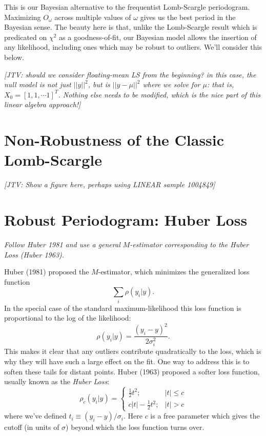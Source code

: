 \documentclass[12pt,pdftex]{article}
\newcommand{\jake}[1]{{\color{blue}\it[JTV: #1]}}
\begin{document}
This is our Bayesian alternative to the frequentist Lomb-Scargle periodogram.
Maximizing $O_\omega$ across multiple values of $\omega$ gives us the best period in the Bayesian sense.
The beauty here is that, unlike the Lomb-Scargle result which is predicated on $\chi^2$ as a goodness-of-fit, our Bayesian model allows the insertion of any likelihood, including ones which may be robust to outliers. We'll consider this below.

\jake{should we consider floating-mean LS from the beginning? in this case, the null model is not just $||y||^2$, but is $||y - \mu||^2$ where we solve for $\mu$: that is, $X_0 = [1, 1, \cdots 1]^T$. Nothing else needs to be modified, which is the nice part of this linear algebra approach!}

\section{Non-Robustness of the Classic Lomb-Scargle}

\jake{Show a figure here, perhaps using LINEAR sample 1004849}

\section{Robust Periodogram: Huber Loss}
{\it Follow Huber 1981 and use a general $M$-estimator corresponding to the Huber Loss (Huber 1963).}

Huber (1981) proposed the $M$-estimator, which minimizes the generalized loss function
\begin{equation}
  \sum_i \rho(y_i|y).
\end{equation}
In the special case of the standard maximum-likelihood this loss function is proportional to the log of the likelihood:
\begin{equation}
  \rho(y_i|y) = \frac{(y_i - y)^2}{2\sigma_i^2}.
\end{equation}
This makes it clear that any outliers contribute quadratically to the loss, which is why they will have such a large effect on the fit.
One way to address this is to soften these tails for distant points. Huber (1963) proposed a softer loss function, usually known as the {\it Huber Loss}:
\begin{equation}
  \rho_c(y_i|y) = \left\{
  \begin{array}{ll}
    \frac{1}{2}t^2; & |t| \le c \\
    c|t| - \frac{1}{2}t^2; & |t| > c
  \end{array}
  \right.
\end{equation}
where we've defined $t_i \equiv (y_i - y) / \sigma_i$. Here $c$ is a free parameter which gives the cutoff (in units of $\sigma$) beyond which the loss function turns over.
\end{document}
